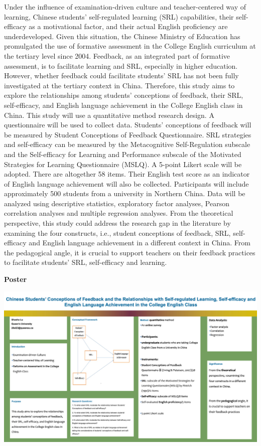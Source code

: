 \documentclass[
]{book}
\begin{document}
Under the influence of examination-driven culture and teacher-centered way of learning, Chinese students' self-regulated learning (SRL) capabilities, their self-efficacy as a motivational factor, and their actual English proficiency are underdeveloped. Given this situation, the Chinese Ministry of Education has promulgated the use of formative assessment in the College English curriculum at the tertiary level since 2004. Feedback, as an integrated part of formative assessment, is to facilitate learning and SRL, especially in higher education. However, whether feedback could facilitate students' SRL has not been fully investigated at the tertiary context in China. Therefore, this study aims to explore the relationships among students' conceptions of feedback, their SRL, self-efficacy, and English language achievement in the College English class in China. This study will use a quantitative method research design. A questionnaire will be used to collect data. Students' conceptions of feedback will be measured by Student Conceptions of Feedback Questionnaire. SRL strategies and self-efficacy can be measured by the Metacognitive Self-Regulation subscale and the Self-efficacy for Learning and Performance subscale of the Motivated Strategies for Learning Questionnaire (MSLQ). A 5-point Likert scale will be adopted. There are altogether 58 items. Their English test score as an indicator of English language achievement will also be collected. Participants will include approximately 500 students from a university in Northern China. Data will be analyzed using descriptive statistics, exploratory factor analyses, Pearson correlation analyses and multiple regression analyses. From the theoretical perspective, this study could address the research gap in the literature by examining the four constructs, i.e., student conceptions of feedback, SRL, self-efficacy and English language achievement in a different context in China. From the pedagogical angle, it is crucial to support teachers on their feedback practices to facilitate students' SRL, self-efficacy and learning.

\textbf{Poster}

\includegraphics{Content/SL.png}
\end{document}
